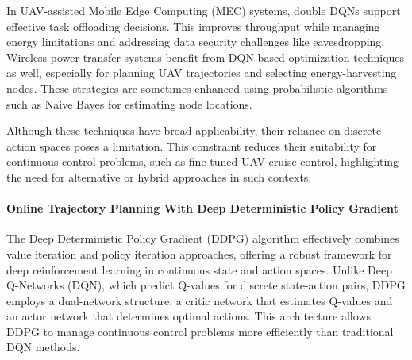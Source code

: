 In UAV-assisted Mobile Edge Computing (MEC) systems, double DQNs support effective task offloading decisions. This improves throughput while managing energy limitations and addressing data security challenges like eavesdropping. Wireless power transfer systems benefit from DQN-based optimization techniques as well, especially for planning UAV trajectories and selecting energy-harvesting nodes. These strategies are sometimes enhanced using probabilistic algorithms such as Naive Bayes for estimating node locations.

Although these techniques have broad applicability, their reliance on discrete action spaces poses a limitation. This constraint reduces their suitability for continuous control problems, such as fine-tuned UAV cruise control, highlighting the need for alternative or hybrid approaches in such contexts.





\paragraph{Online Trajectory Planning With Deep Deterministic
 Policy Gradient}



The Deep Deterministic Policy Gradient (DDPG) algorithm effectively combines value iteration and policy iteration approaches, offering a robust framework for deep reinforcement learning in continuous state and action spaces. Unlike Deep Q-Networks (DQN), which predict Q-values for discrete state-action pairs, DDPG employs a dual-network structure: a critic network that estimates Q-values and an actor network that determines optimal actions. This architecture allows DDPG to manage continuous control problems more efficiently than traditional DQN methods.

